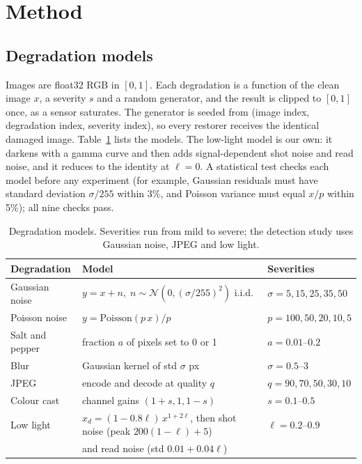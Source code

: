 \documentclass[11pt]{article}
\newcommand{\tabref}[1]{Table~\ref{#1}}
\begin{document}
\section{Method}
\label{sec:method}

\subsection{Degradation models}
\label{sec:degradations}
Images are float32 RGB in $[0,1]$. Each degradation is a function of the clean image $x$, a severity $s$ and a random generator, and the result is clipped to $[0,1]$ once, as a sensor saturates. The generator is seeded from (image index, degradation index, severity index), so every restorer receives the identical damaged image. \tabref{tab:degradations} lists the models. The low-light model is our own: it darkens with a gamma curve and then adds signal-dependent shot noise and read noise, and it reduces to the identity at $\ell=0$. A statistical test checks each model before any experiment (for example, Gaussian residuals must have standard deviation $\sigma/255$ within 3\%, and Poisson variance must equal $x/p$ within 5\%); all nine checks pass.

\begin{table}[t]
\centering\small
\caption{Degradation models. Severities run from mild to severe; the detection study uses Gaussian noise, JPEG and low light.}
\label{tab:degradations}
\begin{tabular}{@{}lll@{}}
\toprule
Degradation & Model & Severities \\
\midrule
Gaussian noise & $y = x + n,\; n \sim \mathcal{N}(0, (\sigma/255)^2)$ i.i.d. & $\sigma = 5, 15, 25, 35, 50$ \\
Poisson noise & $y = \mathrm{Poisson}(p\,x)/p$ & $p = 100, 50, 20, 10, 5$ \\
Salt and pepper & fraction $a$ of pixels set to 0 or 1 & $a = 0.01$--$0.2$ \\
Blur & Gaussian kernel of std $\sigma$ px & $\sigma = 0.5$--$3$ \\
JPEG & encode and decode at quality $q$ & $q = 90, 70, 50, 30, 10$ \\
Colour cast & channel gains $(1+s, 1, 1-s)$ & $s = 0.1$--$0.5$ \\
Low light & $x_d = (1-0.8\ell)\,x^{1+2\ell}$, then shot noise (peak $200(1-\ell)+5$) & $\ell = 0.2$--$0.9$ \\
 & and read noise (std $0.01 + 0.04\ell$) & \\
\bottomrule
\end{tabular}
\end{table}
\end{document}
